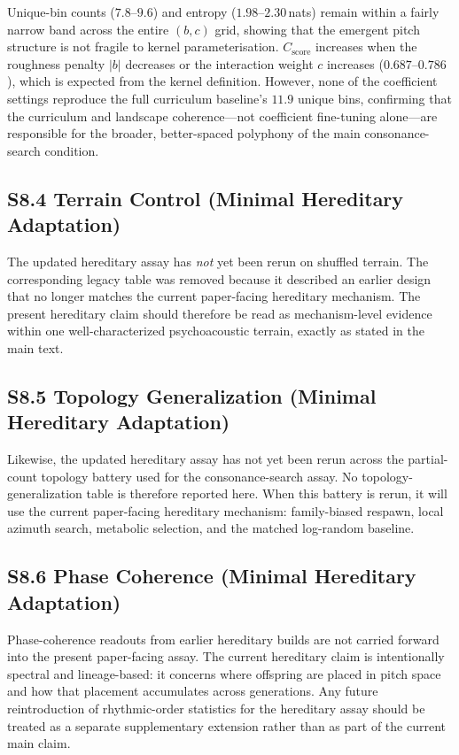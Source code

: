 \documentclass[letterpaper]{article}
\begin{document}
Unique-bin counts ($7.8$--$9.6$) and entropy ($1.98$--$2.30$\,nats) remain within a fairly narrow band across the entire $(b,c)$ grid, showing that the emergent pitch structure is not fragile to kernel parameterisation.
$C_{\text{score}}$ increases when the roughness penalty $|b|$ decreases or the interaction weight $c$ increases ($0.687$--$0.786$), which is expected from the kernel definition.
However, none of the coefficient settings reproduce the full curriculum baseline's $11.9$ unique bins, confirming that the curriculum and landscape coherence---not coefficient fine-tuning alone---are responsible for the broader, better-spaced polyphony of the main consonance-search condition.

\subsection{S8.4 Terrain Control (Minimal Hereditary Adaptation)}

The updated hereditary assay has \emph{not} yet been rerun on shuffled terrain. The corresponding legacy table was removed because it described an earlier design that no longer matches the current paper-facing hereditary mechanism. The present hereditary claim should therefore be read as mechanism-level evidence within one well-characterized psychoacoustic terrain, exactly as stated in the main text.

\subsection{S8.5 Topology Generalization (Minimal Hereditary Adaptation)}

Likewise, the updated hereditary assay has not yet been rerun across the partial-count topology battery used for the consonance-search assay. No topology-generalization table is therefore reported here. When this battery is rerun, it will use the current paper-facing hereditary mechanism: family-biased respawn, local azimuth search, metabolic selection, and the matched log-random baseline.

\subsection{S8.6 Phase Coherence (Minimal Hereditary Adaptation)}

Phase-coherence readouts from earlier hereditary builds are not carried forward into the present paper-facing assay. The current hereditary claim is intentionally spectral and lineage-based: it concerns where offspring are placed in pitch space and how that placement accumulates across generations. Any future reintroduction of rhythmic-order statistics for the hereditary assay should be treated as a separate supplementary extension rather than as part of the current main claim.
\end{document}
